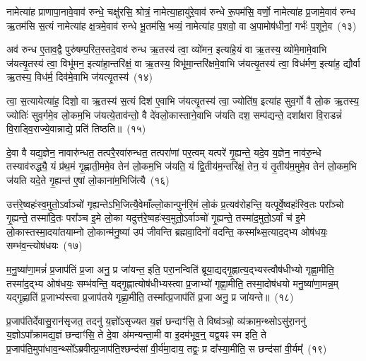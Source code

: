 नामेत्या॑ह प्राणापा॒नावे॒वाव॑ रुन्धे॒ चक्षु॑रसि॒ श्रोत्रं॒ नामेत्या॒हायु॑रे॒वाव॑ रुन्धे रू॒पम॑सि॒ वर्णो॒ नामेत्या॑ह प्र॒जामे॒वाव॑ रुन्ध ऋ॒तम॑सि स॒त्यं नामेत्या॑ह क्ष॒त्रमे॒वाव॑ रुन्धे भू॒तम॑सि॒ भव्यं॒ नामेत्या॑ह प॒शवो॒ वा अ॒पामोष॑धीनां॒ गर्भः॑ प॒शूने॒व~(१३)

अव॑ रुन्ध ए॒ताव॒द्वै पुरु॑षम्प॒रित॒स्तदे॒वाव॑ रुन्ध ऋ॒तस्य॑ त्वा॒ व्यो॑मन॒ इत्या॑हे॒यं वा ऋ॒तस्य॒ व्यो॑मे॒मामे॒वाभि ज॑यत्यृ॒तस्य॑ त्वा॒ विभू॑मन॒ इत्या॑हा॒न्तरि॑क्षं॒ वा ऋ॒तस्य॒ विभू॑मा॒न्तरि॑क्षमे॒वाभि ज॑यत्यृ॒तस्य॑ त्वा॒ विध॑र्मण॒ इत्या॑ह॒ द्यौर्वा ऋ॒तस्य॒ विध॑र्म॒ दिव॑मे॒वाभि ज॑यत्यृ॒तस्य॑~(१४)

त्वा॒ स॒त्यायेत्या॑ह॒ दिशो॒ वा ऋ॒तस्य॑ स॒त्यं दिश॑ ए॒वाभि ज॑यत्यृ॒तस्य॑ त्वा॒ ज्योति॑ष॒ इत्या॑ह सुव॒र्गो वै लो॒क ऋ॒तस्य॒ ज्योतिः॑ सुव॒र्गमे॒व लो॒कम॒भि ज॑यत्ये॒ताव॑न्तो॒ वै दे॑वलो॒कास्ताने॒वाभि ज॑यति दश॒ सम्प॑द्यन्ते॒ दशा᳚क्षरा वि॒राडन्नं॑ वि॒राड्वि॒राज्ये॒वान्नाद्ये॒ प्रति॑ तिष्ठति॥~(१५)

{\anuvakamend[{व्यो॑मन ऋ॒तस्य॑ प्रा॒णः प॒शूने॒व विध॑र्म॒ दिव॑मे॒वाभि ज॑यत्यृ॒तस्य॒ षट्च॑त्वारिꣳशच्च}]}%

दे॒वा वै यद्य॒ज्ञेन॒ नावारु॑न्धत॒ तत्परै॒रवा॑रुन्धत॒ तत्परा॑णां पर॒त्वम् यत्परे॑ गृ॒ह्यन्ते॒ यदे॒व य॒ज्ञेन॒ नाव॑रु॒न्धे तस्याव॑रुद्ध्यै॒ यं प्र॑थ॒मं गृ॒ह्णाती॒ममे॒व तेन॑ लो॒कम॒भि ज॑यति॒ यं द्वि॒तीय॑म॒न्तरि॑क्षं॒ तेन॒ यं तृ॒तीय॑म॒मुमे॒व तेन॑ लो॒कम॒भि ज॑यति यदे॒ते गृ॒ह्यन्त॑ ए॒षां लो॒काना॑म॒भिजि॑त्यै~(१६)

उत्त॑रे॒ष्वहः॑स्व॒मुतो॒\-ऽर्वाञ्चो॑ गृह्यन्ते\-ऽभि॒जित्यै॒वेमाँल्लो॒कान्पुन॑रि॒मं लो॒कं प्र॒त्यव॑रोहन्ति॒ यत्पूर्वे॒ष्वहः॑स्वि॒तः परा᳚ञ्चो गृ॒ह्यन्ते॒ तस्मा॑दि॒तः परा᳚ञ्च इ॒मे लो॒का यदुत्त॑रे॒ष्वहः॑स्व॒मुतो॒\-ऽर्वाञ्चो॑ गृ॒ह्यन्ते॒ तस्मा॑द॒मुतो॒\-ऽर्वां च॑ इ॒मे लो॒कास्तस्मा॒द\-या॑तयाम्नो लो॒कान्म॑नु॒ष्या॑ उप॑ जीवन्ति ब्रह्मवा॒दिनो॑ वदन्ति॒ कस्मा᳚थ्स॒त्याद॒द्भ्य ओष॑धयः॒ सम्भ॑व॒न्त्योष॑धयः~(१७)

म॒नु॒ष्या॑णा॒मन्नं॑ प्र॒जा\-प॑तिं प्र॒जा अनु॒ प्र जा॑यन्त॒ इति॒ परा॒नन्विति॑ ब्रूया॒द्यद्गृ॒ह्णात्य॒द्भ्यस्त्वौष॑धीभ्यो गृह्णा॒मीति॒ तस्मा॑द॒द्भ्य ओष॑धयः॒ सम्भ॑वन्ति॒ यद्गृ॒ह्णात्योष॑धीभ्यस्त्वा प्र॒जाभ्यो॑ गृह्णा॒मीति॒ तस्मा॒दोष॑धयो मनु॒ष्या॑णा॒मन्न॒म् यद्गृ॒ह्णाति॑ प्र॒जाभ्य॑स्त्वा प्र॒जाप॑तये गृह्णा॒मीति॒ तस्मा᳚त्प्र॒जा\-प॑तिं प्र॒जा अनु॒ प्र जा॑यन्ते॥~(१८)

{\anuvakamend[{अ॒भिजि॑त्या॒ ओष॑धयो॒\-ऽष्टाच॑त्वारिꣳशच्च}]}%

प्र॒जा\-प॑तिर्देवासु॒रान॑सृजत॒ तदनु॑ य॒ज्ञो॑\-ऽसृज्यत य॒ज्ञं छन्दाꣳ॑सि॒ ते विष्व॑ञ्चो॒ व्य॑क्राम॒न्थ्सो\-ऽसु॑रा॒ननु॑ य॒ज्ञो\-ऽपा᳚क्रामद्य॒ज्ञं छन्दाꣳ॑सि॒ ते दे॒वा अ॑मन्यन्ता॒मी वा इ॒दम॑भूव॒न्॒ यद्व॒यꣴ स्म इति॒ ते प्र॒जा\-प॑ति॒मुपा॑धाव॒न्थ्सो᳚\-ऽब्रवीत्प्र॒जा\-प॑ति॒श्छन्द॑सां वी॒र्य॑मा॒दाय॒ तद्वः॒ प्र दा᳚स्या॒मीति॒ स छन्द॑सां वी॒र्यम्᳚~(१९)

